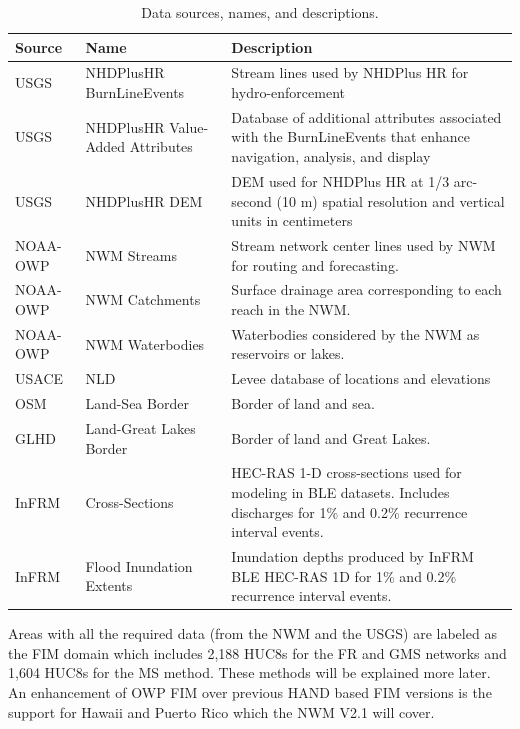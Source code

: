 \documentclass[draft]{dependencies/agujournal2019}
\begin{document}
\begin{table}
\caption{Data sources, names, and descriptions.}
\label{tab:data}
\centering
\begin{tabular}{|p{2cm}|p{4cm}|p{8cm}|}
\hline
Source & Name & Description \\
\hline
USGS & NHDPlusHR BurnLineEvents & Stream lines used by NHDPlus HR for hydro-enforcement \\
\hline
USGS & NHDPlusHR Value-Added Attributes & Database of additional attributes associated with the BurnLineEvents that enhance navigation, analysis, and display \\
\hline
USGS & NHDPlusHR DEM & DEM used for NHDPlus HR at 1/3 arc-second (10 m) spatial resolution and vertical units in centimeters \\
\hline
NOAA-OWP & NWM Streams & Stream network center lines used by NWM for routing and forecasting. \\
\hline
NOAA-OWP & NWM Catchments & Surface drainage area corresponding to each reach in the NWM. \\
\hline
NOAA-OWP & NWM Waterbodies & Waterbodies considered by the NWM as reservoirs or lakes. \\
\hline
USACE & NLD & Levee database of locations and elevations  \\
\hline
OSM & Land-Sea Border & Border of land and sea. \\
\hline
GLHD & Land-Great Lakes Border & Border of land and Great Lakes. \\
\hline
InFRM & Cross-Sections & HEC-RAS 1-D cross-sections used for modeling in BLE datasets. Includes discharges for 1\% and 0.2\% recurrence interval events. \\
\hline
InFRM & Flood Inundation Extents & Inundation depths produced by InFRM BLE HEC-RAS 1D for 1\% and 0.2\% recurrence interval events. \\
\hline
\end{tabular}
\end{table}
%
Areas with all the required data (from the NWM and the USGS) are labeled as the FIM domain which includes 2,188 HUC8s for the FR and GMS networks and 1,604 HUC8s for the MS method. 
These methods will be explained more later.
An enhancement of OWP FIM over previous HAND based FIM versions is the support for Hawaii and Puerto Rico which the NWM V2.1 will cover.
%
\end{document}
